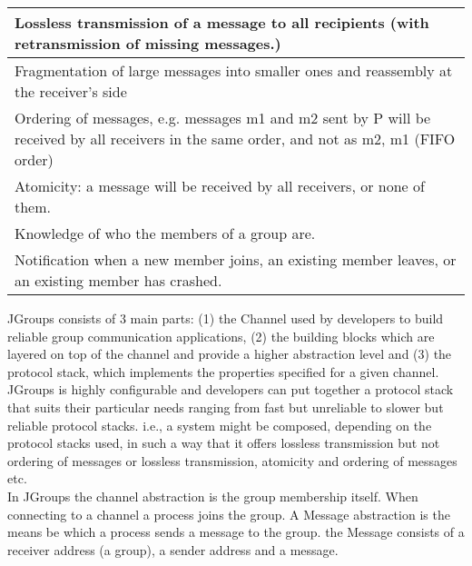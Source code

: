  \label{tab:title}
\begin{tabular}{L{4.45in} }    %
\toprule[1.5pt] %

Lossless transmission of a message to all recipients (with retransmission of missing messages.) \\\midrule
Fragmentation of large messages into smaller ones and reassembly at the receiver's side\\\midrule
Ordering of messages, e.g. messages m1 and m2 sent by P will be received by all receivers in the same order, and not as m2, m1 (FIFO order)\\\midrule
Atomicity: a message will be received by all receivers, or none of them.\\\midrule
Knowledge of who the members of a group are. \\\midrule
Notification when a new member joins, an existing member leaves, or an existing member has crashed.\\

\bottomrule[1.25pt] %
\end {tabular}\par
\bigskip



JGroups consists of 3 main parts: (1) the Channel used by developers to build reliable group communication applications, (2) the building blocks which are layered on top of the channel and provide a higher abstraction level and (3) the protocol stack, which implements the properties specified for a given channel.\\

JGroups is highly configurable and developers can put together a protocol stack that suits their particular needs ranging from fast but unreliable to slower but reliable protocol stacks. i.e., a system might be composed, depending on the protocol stacks used, in such a way that it offers lossless transmission but not ordering of messages or lossless transmission, atomicity and ordering of messages etc.\\

In JGroups the channel abstraction is the group membership itself. When connecting to a channel a process joins the group. A Message abstraction is the means be which a process sends a message to the group. the Message consists of a receiver address (a group), a sender address and a message. 


